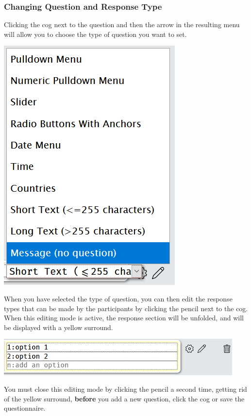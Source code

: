 \documentclass[]{book}
\begin{document}
\subsubsection*{Changing Question and Response
Type}\label{changing-question-and-response-type}

Clicking the cog next to the question and then the arrow in the
resulting menu will allow you to choose the type of question you want to
set.

\includegraphics{images/screenshots/quest_mixed_1.png}

When you have selected the type of question, you can then edit the
response types that can be made by the participants by clicking the
pencil next to the cog. When this editing mode is active, the response
section will be unfolded, and will be displayed with a yellow surround.

\includegraphics{images/screenshots/quest_mixed_2.png}

\begin{warning}
You must close this editing mode by clicking the pencil a second time,
getting rid of the yellow surround, \textbf{before} you add a new
question, click the cog or save the questionnaire.
\end{warning}
\end{document}

